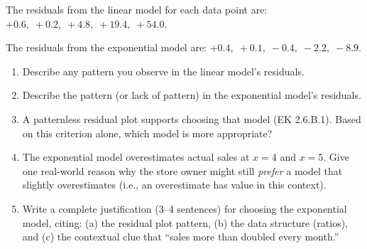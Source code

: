 \documentclass[10pt]{article}
\begin{document}
\vspace{0.1in}

\begin{tcolorbox}[colback=white, colframe=black!40,
    title=\textbf{Tier E --- Extend},
    fonttitle=\bfseries, arc=2mm, left=3mm, right=3mm, top=2mm, bottom=2mm]

The residuals from the linear model for each data point are: $+0.6,\; +0.2,\; +4.8,\; +19.4,\; +54.0$.

The residuals from the exponential model are: $+0.4,\; +0.1,\; -0.4,\; -2.2,\; -8.9$.

\begin{enumerate}[itemsep=10pt]
  \item Describe any pattern you observe in the linear model's residuals.

        \vspace{0.04in}
        \writeline

  \item Describe the pattern (or lack of pattern) in the exponential model's residuals.

        \vspace{0.04in}
        \writeline

  \item A patternless residual plot supports choosing that model (EK 2.6.B.1). Based on
        this criterion alone, which model is more appropriate? \blank{5cm}

  \item The exponential model overestimates actual sales at $x = 4$ and $x = 5$.
        Give one real-world reason why the store owner might still \emph{prefer} a model
        that slightly overestimates (i.e., an overestimate has value in this context).

        \vspace{0.04in}

  \item Write a complete justification (3--4 sentences) for choosing the exponential model,
        citing: (a) the residual plot pattern, (b) the data structure (ratios), and (c) the
        contextual clue that ``sales more than doubled every month.''

        \vspace{0.04in}
\end{enumerate}
\end{tcolorbox}
\end{document}

